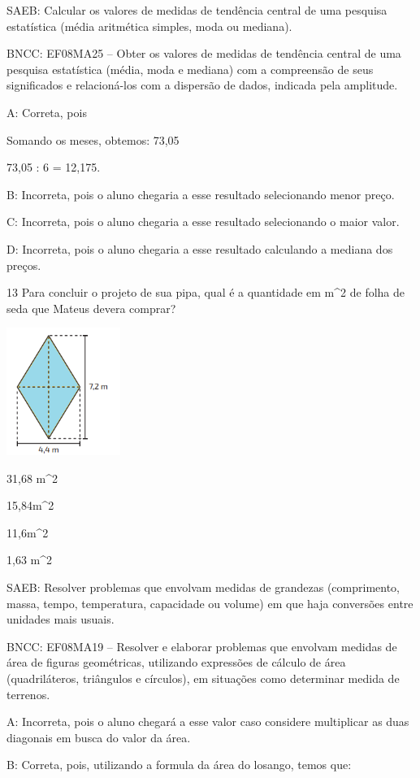 {SAEB: Calcular os valores de medidas de tendência central de uma
pesquisa estatística (média aritmética simples, moda ou mediana).

BNCC: EF08MA25 -- Obter os valores de medidas de tendência central de
uma pesquisa estatística (média, moda e mediana) com a compreensão de
seus significados e relacioná-los com a dispersão de dados, indicada
pela amplitude.

A: Correta, pois

Somando os meses, obtemos: 73,05

73,05 : 6 = 12,175.

B: Incorreta, pois o aluno chegaria a esse resultado selecionando menor
preço.

C: Incorreta, pois o aluno chegaria a esse resultado selecionando o
maior valor.

D: Incorreta, pois o aluno chegaria a esse resultado calculando a
mediana dos preços.

\num{13} Para concluir o projeto de sua pipa, qual é a quantidade em m^2 de
folha de seda que Mateus devera comprar?

\includegraphics[width=1.45833in,height=1.63333in]{./imgSAEB_8_MAT/media/image59.png}
\item 31,68 m^2
\item 15,84m^2
\item 11,6m^2
\item 1,63 m^2

SAEB: Resolver problemas que envolvam medidas de grandezas (comprimento,
massa, tempo, temperatura, capacidade ou volume) em que haja conversões
entre unidades mais usuais.

BNCC: EF08MA19 -- Resolver e elaborar problemas que envolvam medidas de
área de figuras geométricas, utilizando expressões de cálculo de área
(quadriláteros, triângulos e círculos), em situações como determinar
medida de terrenos.

A: Incorreta, pois o aluno chegará a esse valor caso considere
multiplicar as duas diagonais em busca do valor da área.

B: Correta, pois, utilizando a formula da área do losango, temos que:

}
